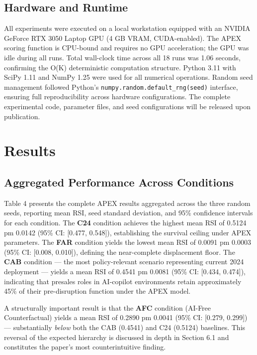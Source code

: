 \documentclass[10pt, conference]{IEEEtran}
\begin{document}
\subsection{Hardware and Runtime}

\label{sec:hardware\_and\_runtime}

All experiments were executed on a local workstation equipped with an NVIDIA GeForce RTX 3050 Laptop GPU (4 GB VRAM, CUDA-enabled). The APEX scoring function is CPU-bound and requires no GPU acceleration; the GPU was idle during all runs. Total wall-clock time across all 18 runs was 1.06 seconds, confirming the O(K) deterministic computation structure. Python 3.11 with SciPy 1.11 \cite{virtanen2020scipy} and NumPy 1.25 were used for all numerical operations. Random seed management followed Python's \texttt{numpy.random.default\_rng(seed)} interface, ensuring full reproducibility across hardware configurations. The complete experimental code, parameter files, and seed configurations will be released upon publication.

\section{Results}

\label{sec:results}

\subsection{Aggregated Performance Across Conditions}

\label{sec:aggregated\_performance\_across\_conditions}

Table 4 presents the complete APEX results aggregated across the three random seeds, reporting mean RSI, seed standard deviation, and 95\% confidence intervals for each condition. The \textbf{C24} condition achieves the highest mean RSI of 0.5124 pm 0.0142 (95\% CI: [0.477, 0.548]), establishing the survival ceiling under APEX parameters. The \textbf{FAR} condition yields the lowest mean RSI of 0.0091 pm 0.0003 (95\% CI: [0.008, 0.010]), defining the near-complete displacement floor. The \textbf{CAB} condition --- the most policy-relevant scenario representing current 2024 deployment --- yields a mean RSI of 0.4541 pm 0.0081 (95\% CI: [0.434, 0.474]), indicating that presales roles in AI-copilot environments retain approximately 45\% of their pre-disruption function under the APEX model.

A structurally important result is that the \textbf{AFC} condition (AI-Free Counterfactual) yields a mean RSI of 0.2890 pm 0.0041 (95\% CI: [0.279, 0.299]) --- substantially \textit{below} both the CAB (0.4541) and C24 (0.5124) baselines. This reversal of the expected hierarchy is discussed in depth in Section 6.1 and constitutes the paper's most counterintuitive finding.
\end{document}
